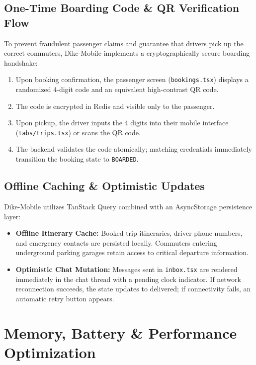 \documentclass[conference,10pt,a4paper]{IEEEtran}
\begin{document}
\subsection{One-Time Boarding Code \& QR Verification Flow}
To prevent fraudulent passenger claims and guarantee that drivers pick up the correct commuters, Dike-Mobile implements a cryptographically secure boarding handshake:
\begin{enumerate}
    \item Upon booking confirmation, the passenger screen (\texttt{bookings.tsx}) displays a randomized 4-digit code and an equivalent high-contrast QR code.
    \item The code is encrypted in Redis and visible only to the passenger.
    \item Upon pickup, the driver inputs the 4 digits into their mobile interface (\texttt{tabs/trips.tsx}) or scans the QR code.
    \item The backend validates the code atomically; matching credentials immediately transition the booking state to \texttt{BOARDED}.
\end{enumerate}

\subsection{Offline Caching \& Optimistic Updates}
Dike-Mobile utilizes TanStack Query combined with an AsyncStorage persistence layer:
\begin{itemize}
    \item \textbf{Offline Itinerary Cache:} Booked trip itineraries, driver phone numbers, and emergency contacts are persisted locally. Commuters entering underground parking garages retain access to critical departure information.
    \item \textbf{Optimistic Chat Mutation:} Messages sent in \texttt{inbox.tsx} are rendered immediately in the chat thread with a pending clock indicator. If network reconnection succeeds, the state updates to delivered; if connectivity fails, an automatic retry button appears.
\end{itemize}

\section{Memory, Battery \& Performance Optimization}
\end{document}
